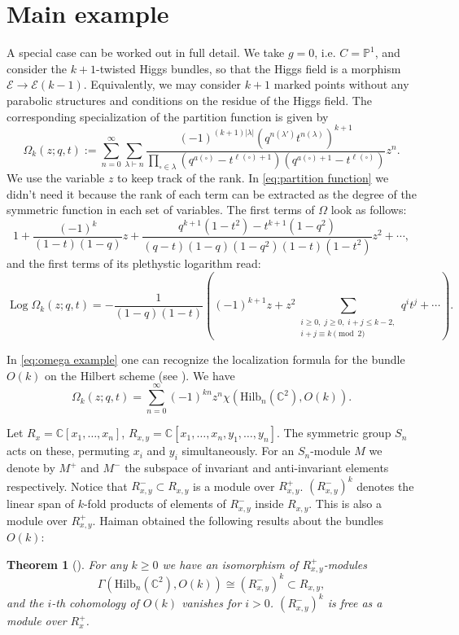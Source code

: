 \documentclass[12pt]{amsart}
\newtheorem{theorem}{Theorem}[section]
\theoremstyle{definition}
\theoremstyle{remark}
\numberwithin{equation}{section}
\newcommand{\BP}{\mathbb P}
\newcommand{\CE}{\mathcal E}
\DeclareMathOperator{\pLog}{Log}
\begin{document}
	\section{Main example} A special case can be worked out in full detail. We take $g=0$, i.e. $C=\BP^1$, and consider the $k+1$-twisted Higgs bundles, so that the Higgs field is a morphism $\CE\to \CE(k-1)$. Equivalently, we may consider $k+1$ marked points without any parabolic structures and conditions on the residue of the Higgs field. The corresponding specialization of the partition function is given by
	\begin{equation}\label{eq:omega example}
		\Omega_k(z; q,t) := 
		\sum_{n=0}^\infty \sum_{\lambda\vdash n} \frac{(-1)^{(k+1)|\lambda|}\left(q^{n(\lambda')} t^{n(\lambda)}\right)^{k+1}}{
			\prod_{\square\in\lambda} (q^{a(\square)} - t^{\ell(\square)+1})(q^{a(\square)+1} - t^{\ell(\square)})} z^{n}.
	\end{equation}
	We use the variable $z$ to keep track of the rank. In \eqref{eq:partition function} we didn't need it because the rank of each term can be extracted as the degree of the symmetric function in each set of variables.
	The first terms of $\Omega$ look as follows:
	\[
	1 + \frac{(-1)^{k}}{(1-t)(1-q)} z + \frac{q^{k+1}(1-t^2)-t^{k+1}(1-q^2)}{(q-t)(1-q)(1-q^2)(1-t)(1-t^2)} z^2 + \cdots,
	\]
	and the first terms of its plethystic logarithm read:
	\begin{equation}\label{eq:plog example}
		\pLog \Omega_k(z; q,t) = -\frac{1}{(1-q)(1-t)}\left((-1)^{k+1} z + 
		z^2 \sum_{\substack{i\geq 0,\; j\geq 0,\; i+j\leq k-2, \\ i+j\equiv k\pmod{2}}} q^i t^j + \cdots\right).
	\end{equation}
	
	In \eqref{eq:omega example} one can recognize the localization formula for the bundle $O(k)$ on the Hilbert scheme (see \cite{haiman2002vanishing}). We have
	\[
	\Omega_k(z; q,t) = \sum_{n=0}^\infty (-1)^{kn} z^n \chi(\mathrm{Hilb}_n(\mathbb{C}^2), O(k)).
	\]
	
	Let $R_x=\mathbb{C}[x_1,\ldots,x_n]$, $R_{x,y}=\mathbb{C}[x_1,\ldots,x_n,y_1,\ldots,y_n]$. The symmetric group $S_n$ acts on these, permuting $x_i$ and $y_i$ simultaneously. For an $S_n$-module $M$ we denote by $M^+$ and $M^-$ the subspace of invariant and anti-invariant elements respectively. Notice that $R_{x,y}^-\subset R_{x,y}$ is a module over $R_{x,y}^+$. $(R_{x,y}^-)^k$ denotes the linear span of $k$-fold products of elements of $R_{x,y}^-$ inside $R_{x,y}$. This is also a module over $R_{x,y}^+$. Haiman obtained the following results about the bundles $O(k)$:
	\begin{theorem}[\cite{haiman2002vanishing}]
		For any $k\geq 0$ we have an isomorphism of $R_{x,y}^+$-modules 
		\[
		\Gamma(\mathrm{Hilb}_n(\mathbb{C}^2), O(k)) \cong (R_{x,y}^-)^k \subset R_{x,y},
		\]
		and the $i$-th cohomology of $O(k)$ vanishes for $i>0$. $(R_{x,y}^-)^k$ is free as a module over $R_x^+$.
	\end{theorem}
	
\end{document}

